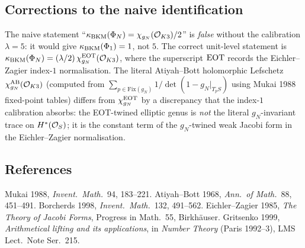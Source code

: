 \subsection*{Corrections to the naive identification}

The naive statement ``$\kappa_{\mathrm{BKM}}(\Phi_N)
= \chi_{g_N}(\mathcal{O}_{K3})/2$'' is \emph{false} without the calibration
$\lambda = 5$: it would give $\kappa_{\mathrm{BKM}}(\Phi_1) = 1$, not $5$.
The correct unit-level statement is
$\kappa_{\mathrm{BKM}}(\Phi_N) = (\lambda/2)\,\chi_{g_N}^{\mathrm{EOT}}(\mathcal{O}_{K3})$,
where the superscript $\mathrm{EOT}$ records the Eichler--Zagier index-$1$
normalisation. The literal Atiyah--Bott holomorphic Lefschetz
$\chi_{g_N}^{\mathrm{AB}}(\mathcal{O}_{K3})$ (computed from
$\sum_{p \in \mathrm{Fix}(g_N)} 1/\det(1 - g_N|_{T_p S})$ using
Mukai 1988 fixed-point tables) differs from $\chi_{g_N}^{\mathrm{EOT}}$ by a
discrepancy that the index-$1$ calibration absorbs: the EOT-twined
elliptic genus is \emph{not} the literal $g_N$-invariant trace on
$H^*(\mathcal{O}_S)$; it is the constant term of the $g_N$-twined weak Jacobi
form in the Eichler--Zagier normalisation.

\subsection*{References}

Mukai 1988, \emph{Invent.\ Math.}~94, 183--221.
Atiyah--Bott 1968, \emph{Ann.\ of Math.}~88, 451--491.
Borcherds 1998, \emph{Invent.\ Math.}~132, 491--562.
Eichler--Zagier 1985, \emph{The Theory of Jacobi Forms},
Progress in Math.~55, Birkh\"auser.
Gritsenko 1999, \emph{Arithmetical lifting and its applications},
in \emph{Number Theory} (Paris 1992--3), LMS Lect.~Note Ser.~215.
